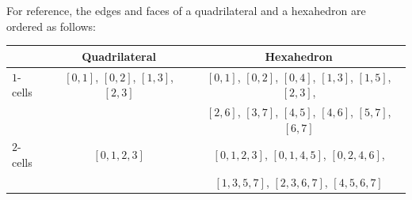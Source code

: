 For reference, the edges and faces of a quadrilateral and a hexahedron are ordered as follows:
\begin{center}
 \begin{tabular}{|l|c|c|}
  \hline
              & Quadrilateral                      & Hexahedron   \\
  \hline
   $1$-cells  & $[0,1]$, $[0,2]$, $[1,3]$, $[2,3]$ & $[0,1]$, $[0,2]$, $[0,4]$, $[1,3]$, $[1,5]$, $[2,3]$, \\
              &                                    & $[2,6]$, $[3,7]$, $[4,5]$, $[4,6]$, $[5,7]$, $[6,7]$ \\
  \hline
   $2$-cells  & $[0,1,2,3]$                        & $[0,1,2,3]$, $[0,1,4,5]$, $[0,2,4,6]$, \\
              &                                    & $[1,3,5,7]$, $[2,3,6,7]$, $[4,5,6,7]$ \\
  \hline
 \end{tabular}

\end{center}



